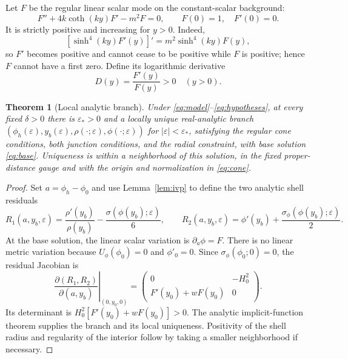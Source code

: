\documentclass[11pt]{article}
\newtheorem{theorem}{Theorem}
\newcommand{\eps}{\varepsilon}
\begin{document}
Let $F$ be the regular linear scalar mode on the constant-scalar background:
\begin{equation}
F''+4k\coth(ky)F'-m^2F=0,\qquad F(0)=1,\quad F'(0)=0.
\label{eq:F}
\end{equation}
It is strictly positive and increasing for $y>0$. Indeed,
\begin{equation}
\left[\sinh^4(ky)F'(y)\right]'=m^2\sinh^4(ky)F(y),
\end{equation}
so $F'$ becomes positive and cannot cease to be positive while $F$ is positive; hence $F$ cannot have a first zero. Define its logarithmic derivative
\begin{equation}
D(y)=\frac{F'(y)}{F(y)}>0\quad(y>0).
\label{eq:Ddef}
\end{equation}

\begin{theorem}[Local analytic branch]\label{thm:branch}
Under \eqref{eq:model}--\eqref{eq:hypotheses}, at every fixed $\delta>0$ there is $\eps_*>0$ and a locally unique real-analytic branch
$(\phi_h(\eps),y_b(\eps),\rho(\cdot;\eps),\phi(\cdot;\eps))$
for $|\eps|<\eps_*$, satisfying the regular cone conditions, both junction conditions, and the radial constraint, with base solution \eqref{eq:base}. Uniqueness is within a neighborhood of this solution, in the fixed proper-distance gauge and with the origin and normalization in \eqref{eq:cone}.
\end{theorem}
\begin{proof}
Set $a=\phi_h-\phi_0$ and use Lemma~\ref{lem:ivp} to define the two analytic shell residuals
\begin{equation}
R_1(a,y_b,\eps)=\frac{\rho'(y_b)}{\rho(y_b)}-\frac{\sigma(\phi(y_b);\eps)}{6},
\qquad
R_2(a,y_b,\eps)=\phi'(y_b)+\frac{\sigma_\phi(\phi(y_b);\eps)}{2}.
\end{equation}
At the base solution, the linear scalar variation is $\partial_a\phi=F$. There is no linear metric variation because $U_\phi(\phi_0)=0$ and $\phi'_0=0$. Since $\sigma_\phi(\phi_0;0)=0$, the residual Jacobian is
\begin{equation}
\left.\frac{\partial(R_1,R_2)}{\partial(a,y_b)}\right|_{(0,y_0,0)}
=\begin{pmatrix}
0&-H_0^2\\
F'(y_0)+wF(y_0)&0
\end{pmatrix}.\label{eq:jacobian}
\end{equation}
Its determinant is $H_0^2[F'(y_0)+wF(y_0)]>0$. The analytic implicit-function theorem supplies the branch and its local uniqueness. Positivity of the shell radius and regularity of the interior follow by taking a smaller neighborhood if necessary.
\end{proof}
\end{document}
